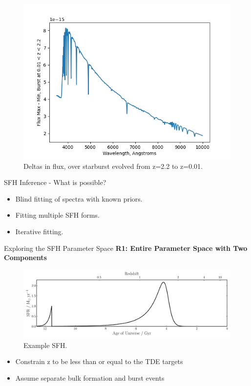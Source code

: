 \documentclass{beamer}
\begin{document}
\begin{frame}{}
  \begin{figure}
    \centering
    \includegraphics[width=\textwidth]{figure1}
    \caption{Deltas in flux, over starburst evolved from z=2.2 to z=0.01.}
  \end{figure}
\end{frame}

\begin{frame}{SFH Inference - What is possible?}
  \begin{itemize}
    \item Blind fitting of spectra with known priors.
    \item Fitting multiple SFH forms.
    \item Iterative fitting.
  \end{itemize}
\end{frame}

\begin{frame}{Exploring the SFH Parameter Space}
  \textbf{R1: Entire Parameter Space with Two Components}
  \begin{figure}
    \centering
    \includegraphics[width=\textwidth]{../pipes/plots/r0_priors/phil_model_4_sfh}
    \caption{Example SFH.}
  \end{figure}
  \begin{itemize}
    \item Constrain z to be less than or equal to the TDE targets
    \item Assume separate bulk formation and burst events
  \end{itemize}
\end{frame}
\end{document}
